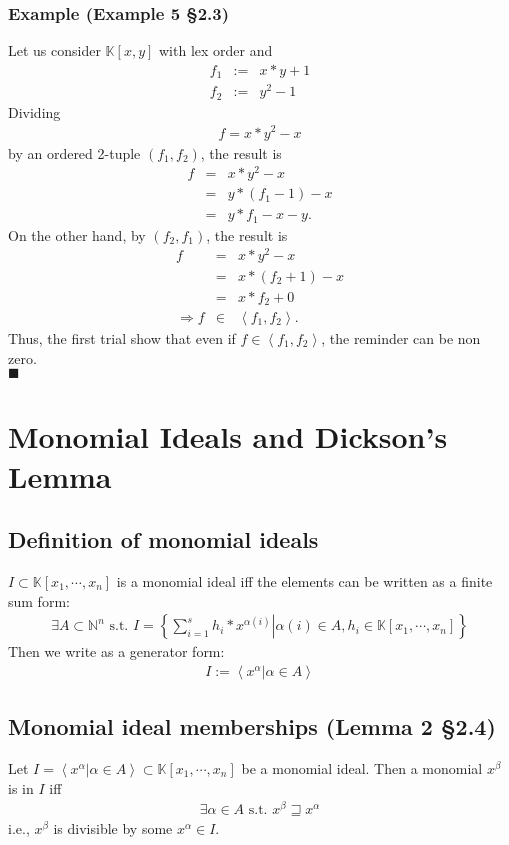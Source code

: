 \documentclass[11pt]{book}
\begin{document}
\subsubsection{Example (Example 5 \S2.3)}
Let us consider $\mathbb{K}[x,y]$ with lex order and
\begin{eqnarray}
f_1 &:=& x*y + 1\\
f_2 &:=& y^2 -1
\end{eqnarray}
Dividing
\begin{eqnarray}
f = x*y^2 -x
\end{eqnarray}
by an ordered 2-tuple $(f_1, f_2)$, the result is
\begin{eqnarray}
f &=& x*y^2 -x \\
&=& y*(f_1 -1) -x \\
&=& y*f_1 -x-y.
\end{eqnarray}
On the other hand, by $(f_2, f_1)$, the result is
\begin{eqnarray}
f &=& x*y^2 -x \\
&=& x*(f_2 + 1) -x \\
&=& x*f_2 + 0\\
\Rightarrow f &\in& \left< f_1, f_2\right>.
\end{eqnarray}
Thus, the first trial show that even if $f \in \left< f_1, f_2\right>$, the reminder can be non zero.\\
$\blacksquare$

\section{Monomial Ideals and Dickson's Lemma}
\subsection{Definition of monomial ideals}
$I \subset \mathbb{K}[x_1, \cdots, x_n]$ is a monomial ideal iff the elements can be written as a finite sum form:
\begin{eqnarray}
\exists A \subset \mathbb{N}^n \text{ s.t. } I = \left\{\left. \sum_{i=1}^s h_i * x^{\alpha(i)} \right| \alpha(i) \in A, h_i \in \mathbb{K}[x_1, \cdots, x_n] \right\}
\end{eqnarray}
Then we write as a generator form:
\begin{eqnarray}
I := \left<\left. x^\alpha \right| \alpha \in A\right>
\end{eqnarray}

\subsection{Monomial ideal memberships (Lemma 2 \S2.4)}
\label{Lemma2OfSection2_3}
Let $I = \left<\left. x^\alpha \right| \alpha \in A\right> \subset \mathbb{K}[x_1, \cdots, x_n]$ be a monomial ideal.
Then a monomial $x^\beta$ is in $I$ iff 
\begin{eqnarray}
\exists \alpha \in A \text{ s.t. } x^\beta \sqsupseteq x^\alpha
\end{eqnarray}
i.e., $x^\beta$ is divisible by some $x^\alpha \in I$.
\end{document}
